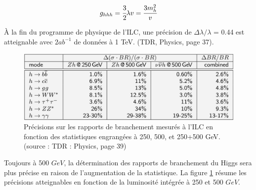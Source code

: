    \begin{equation}
    g_{hhh} = \cfrac{3}{2} \lambda v = \cfrac{3 m_h^2}{v}
   \end{equation}

   \`A la fin du programme de physique de l'ILC, une pr\'ecision de $\Delta \lambda / \lambda$ = 0.44 est atteignable avec $2 ab^{-1}$ de donn\'ees \`a 1 TeV. (TDR, Physics, page 37).
   
   \medskip
  
  \begin{figure}[!htb]
    \begin{center} 
      \includegraphics[scale=0.38]{./figures/BR_Higgs_500GeV.png}
      \caption{Pr\'ecisions sur les rapports de branchement mesur\'es \`a l'ILC en fonction des statistiques engrang\'ees \`a 250, 500, et 250+500 GeV.(source : TDR : Physics, page 39)}
     \label{fig:BR_500GeV}
     \end{center}
  \end{figure} 
   
   Toujours \`a 500 $GeV$, la d\'etermination des rapports de branchement du Higgs sera plus pr\'ecise en raison de l'augmentation de la statistique. La figure \ref{fig:BR_500GeV} r\'esume les pr\'ecisions atteignables en fonction de la luminosit\'e int\'egr\'ee \`a 250 et 500 $GeV$.   
   
   
   \medskip

